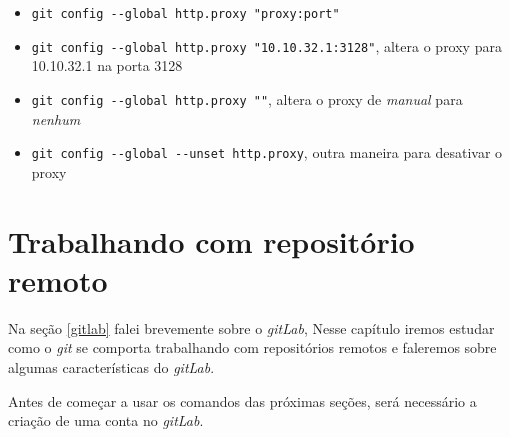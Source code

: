 \documentclass[12pt,openright,oneside,a4paper,english,brazil]{abntex2}
\begin{document}
\begin{itemize}
	\item \verb|git config --global http.proxy "proxy:port"|
	\item \verb|git config --global http.proxy "10.10.32.1:3128"|, altera o proxy para  10.10.32.1 na porta 3128
	\item \verb|git config --global http.proxy ""|, altera o proxy de \textit{manual} para \textit{nenhum}
	\item  \verb|git config --global --unset http.proxy|, outra maneira para desativar o proxy
\end{itemize}


\chapter{Trabalhando com repositório remoto}

Na seção \ref{gitlab} falei brevemente sobre o \textit{gitLab}, Nesse capítulo iremos estudar como o \textit{git} se comporta trabalhando com repositórios remotos e faleremos sobre algumas características do \textit{gitLab}.

Antes de começar a usar os comandos das próximas seções, será necessário a criação de uma conta no \textit{gitLab}.

%
%
	 		
\end{document}
